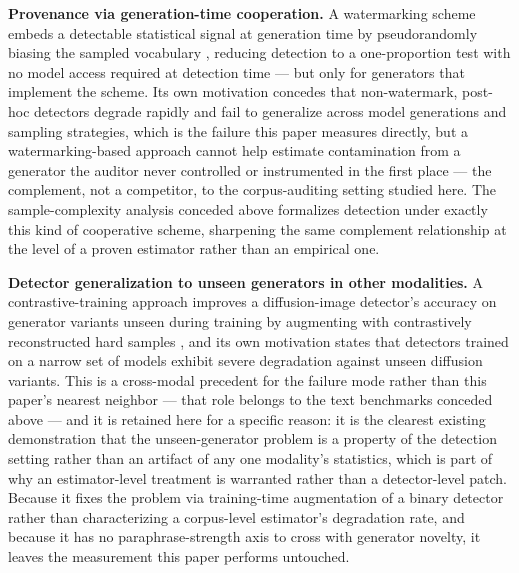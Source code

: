 \documentclass[11pt]{article}
\begin{document}
\textbf{Provenance via generation-time cooperation.} A watermarking scheme embeds a detectable statistical signal at generation time by pseudorandomly biasing the sampled vocabulary \citep{KirchenbauerWatermark2023}, reducing detection to a one-proportion test with no model access required at detection time --- but only for generators that implement the scheme. Its own motivation concedes that non-watermark, post-hoc detectors degrade rapidly and fail to generalize across model generations and sampling strategies, which is the failure this paper measures directly, but a watermarking-based approach cannot help estimate contamination from a generator the auditor never controlled or instrumented in the first place --- the complement, not a competitor, to the corpus-auditing setting studied here. The sample-complexity analysis conceded above \citep{SampleComplexitiesofEsti700224} formalizes detection under exactly this kind of cooperative scheme, sharpening the same complement relationship at the level of a proven estimator rather than an empirical one.

\textbf{Detector generalization to unseen generators in other modalities.} A contrastive-training approach improves a diffusion-image detector's accuracy on generator variants unseen during training by augmenting with contrastively reconstructed hard samples \citep{DRCT2024DiffusionRecon}, and its own motivation states that detectors trained on a narrow set of models exhibit severe degradation against unseen diffusion variants. This is a cross-modal precedent for the failure mode rather than this paper's nearest neighbor --- that role belongs to the text benchmarks conceded above --- and it is retained here for a specific reason: it is the clearest existing demonstration that the unseen-generator problem is a property of the detection setting rather than an artifact of any one modality's statistics, which is part of why an estimator-level treatment is warranted rather than a detector-level patch. Because it fixes the problem via training-time augmentation of a binary detector rather than characterizing a corpus-level estimator's degradation rate, and because it has no paraphrase-strength axis to cross with generator novelty, it leaves the measurement this paper performs untouched.
\end{document}
